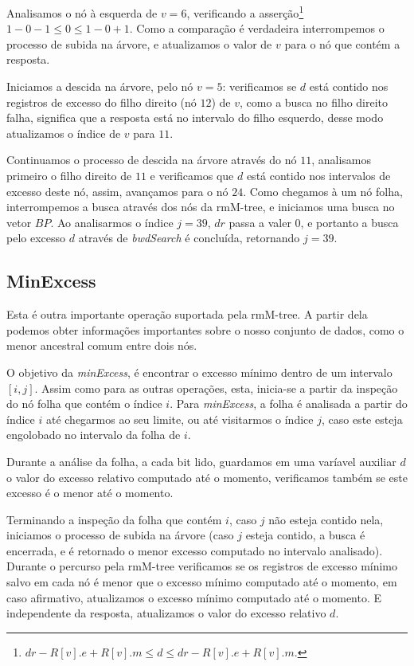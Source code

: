 \begin{example}
        Analisamos o nó à esquerda de $v=6$, verificando a asserção\footnote{$dr - R[v].e + R[v].m \leq d \leq dr - R[v].e + R[v].m$.} $ 1 -0 -1 \leq 0 \leq 1 -0 +1$. Como a comparação é verdadeira interrompemos o processo de subida na árvore, e atualizamos o valor de $v$ para o nó que contém a resposta.
        
        Iniciamos a descida na árvore, pelo nó $v=5$: verificamos se $d$ está contido nos registros de excesso do filho direito (nó $12$) de $v$, como a busca no filho direito falha, significa que a resposta está no intervalo do filho esquerdo, desse modo atualizamos o índice de $v$ para $11$.

        Continuamos o processo de descida na árvore através do nó $11$, analisamos primeiro o filho direito de $11$ e verificamos que $d$ está contido nos intervalos de excesso deste nó, assim, avançamos para o nó $24$. Como chegamos à um nó folha, interrompemos a busca através dos nós da rmM-tree, e iniciamos uma busca no vetor $BP$. Ao analisarmos o índice $j=39$, $dr$ passa a valer $0$, e portanto a busca pelo excesso $d$ através de \textit{bwdSearch} é concluída, retornando $j=39$. 
    \end{example}




    \subsection{MinExcess}
    Esta é outra importante operação suportada pela rmM-tree. A partir dela podemos obter informações importantes sobre o nosso conjunto de dados, como o menor ancestral comum entre dois nós.
    
    
    O objetivo da \textit{minExcess}, é encontrar o excesso mínimo dentro de um intervalo $[i, j]$. Assim como para as outras operações, esta, inicia-se a partir da inspeção do nó folha que contém o índice $i$. Para \textit{minExcess}, a folha é analisada a partir do índice $i$ até chegarmos ao seu limite, ou até visitarmos o índice $j$, caso este esteja engolobado no intervalo da folha de $i$. 

    Durante a análise da folha, a cada bit lido, guardamos em uma varíavel auxiliar $d$ o valor do excesso relativo computado até o momento, verificamos também se este excesso é o menor até o momento.

    Terminando a inspeção da folha que contém $i$, caso $j$ não esteja contido nela, iniciamos o processo de subida na árvore (caso $j$ esteja contido, a busca é encerrada, e é retornado o menor excesso computado no intervalo analisado). Durante o percurso pela rmM-tree verificamos se os registros de excesso mínimo salvo em cada nó é menor que o excesso mínimo computado até o momento, em caso afirmativo, atualizamos o excesso mínimo computado até o momento. E independente da resposta, atualizamos o valor do excesso relativo $d$.

